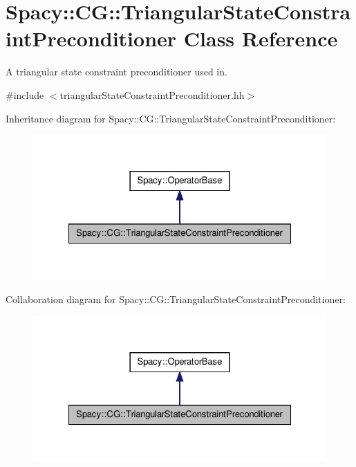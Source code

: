 \hypertarget{classSpacy_1_1CG_1_1TriangularStateConstraintPreconditioner}{\section{\-Spacy\-:\-:\-C\-G\-:\-:\-Triangular\-State\-Constraint\-Preconditioner \-Class \-Reference}
\label{classSpacy_1_1CG_1_1TriangularStateConstraintPreconditioner}
}


\-A triangular state constraint preconditioner used in.  




{\ttfamily \#include $<$triangular\-State\-Constraint\-Preconditioner.\-hh$>$}



\-Inheritance diagram for \-Spacy\-:\-:\-C\-G\-:\-:\-Triangular\-State\-Constraint\-Preconditioner\-:
\nopagebreak
\begin{figure}[H]
\begin{center}
\leavevmode
\includegraphics[width=324pt]{classSpacy_1_1CG_1_1TriangularStateConstraintPreconditioner__inherit__graph}
\end{center}
\end{figure}


\-Collaboration diagram for \-Spacy\-:\-:\-C\-G\-:\-:\-Triangular\-State\-Constraint\-Preconditioner\-:
\nopagebreak
\begin{figure}[H]
\begin{center}
\leavevmode
\includegraphics[width=324pt]{classSpacy_1_1CG_1_1TriangularStateConstraintPreconditioner__coll__graph}
\end{center}
\end{figure}
